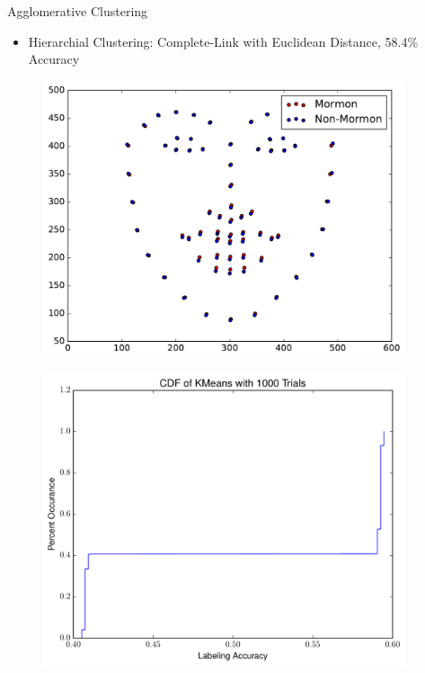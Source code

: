 \documentclass[final]{beamer}
\newlength{\sepwid}
\newlength{\onecolwid}
\begin{document}
\begin{frame}[t]
\begin{columns}[t]

\begin{column}{\sepwid}\end{column}

\begin{column}{\onecolwid}

\begin{block}{Agglomerative Clustering}

\begin{itemize}
  \item Hierarchial Clustering:
    Complete-Link with Euclidean Distance, 58.4\% Accuracy
\end{itemize}

\begin{figure}
\centering
  \includegraphics[width=.75\linewidth]{../data/average_sift.pdf}
  \label{fig:sift_avg}
\end{figure}

\begin{figure}
\centering
  \includegraphics[width=.75\linewidth]{../data/kmeans_cdf.pdf}
  \label{fig:kmeans_cdf}
\end{figure}



\end{block}
\end{column}
\end{columns}
\end{frame}
\end{document}
